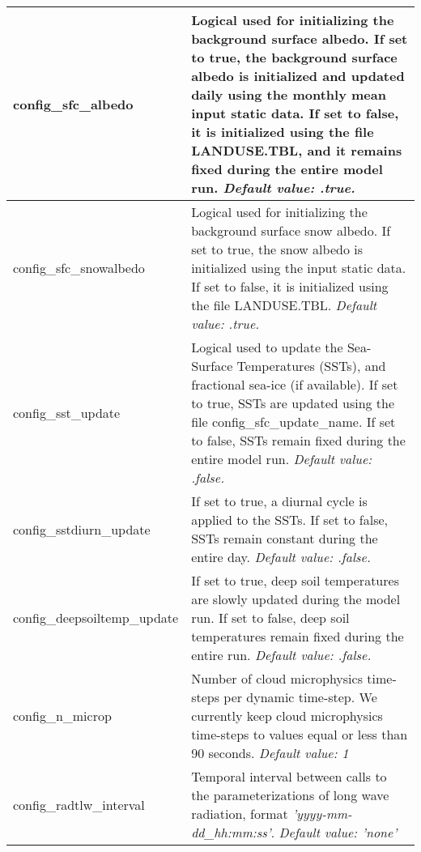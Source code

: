 {\begin{longtable}{|p{2.0in} |p{4.25in}|}
  config\_sfc\_albedo & Logical used for initializing the background surface albedo. If set to true, the background surface albedo is initialized and updated daily using the monthly mean input static data. If set to false, it is initialized using the file LANDUSE.TBL, and it remains fixed during the entire model run. \newline 
  {\em Default value: .true.} \\ \hline
  
    config\_sfc\_snowalbedo & Logical used for initializing the background surface snow albedo. If set to true, the snow albedo is initialized using the input static data. 
    If set to false, it is initialized using the file LANDUSE.TBL.\newline 
  {\em Default value: .true.} \\ \hline

  config\_sst\_update & Logical used to update the Sea-Surface Temperatures (SSTs), and fractional sea-ice (if available). If set to true, SSTs are updated using the file config\_sfc\_update\_name. If set to false, SSTs remain fixed during the entire model run. \newline 
  {\em Default value: .false.} \\ \hline

  config\_sstdiurn\_update & If set to true, a diurnal cycle is applied to the SSTs. If set to false, SSTs remain constant during the entire day.\newline 
  {\em Default value: .false.} \\ \hline

  config\_deepsoiltemp\_update & If set to true, deep soil temperatures are slowly updated during the model run. If set to false, deep soil temperatures remain fixed during the entire run. \newline 
  {\em Default value: .false.} \\ \hline

  config\_n\_microp & Number of cloud microphysics time-steps per dynamic time-step. We currently keep cloud microphysics time-steps to values equal or less than 90 seconds. \newline 
  {\em Default value: 1} \\ \hline
  
  config\_radtlw\_interval & Temporal interval between calls to the parameterizations of long wave radiation, format {\em 'yyyy-mm-dd\_hh:mm:ss'}. \newline 
  {\em Default value: 'none'} \\ \hline


\end{longtable}}
